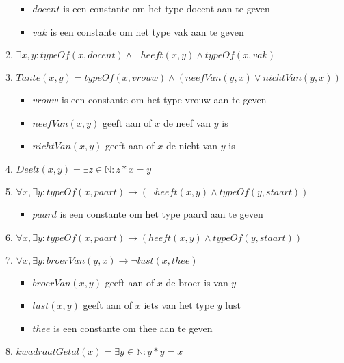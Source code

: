\documentclass[]{article}
\begin{document}
\begin{enumerate}[a]
\begin{enumerate}[i]
\begin{itemize}
        \item $docent$ is een constante om het type docent aan te geven
        \item $vak$ is een constante om het type vak aan te geven
      \end{itemize}
      \item $ \exists x,y : typeOf(x,docent) \land \neg heeft(x,y) \land typeOf(x,vak) $
      \item $ Tante(x,y) = typeOf(x,vrouw) \land (neefVan(y,x) \lor nichtVan(y,x)) $
      \begin{itemize}
        \item $vrouw$ is een constante om het type vrouw aan te geven
        \item $neefVan(x,y)$ geeft aan of $x$ de neef van $y$ is
        \item $nichtVan(x,y)$ geeft aan of $x$ de nicht van $y$ is
      \end{itemize}
      \item $Deelt(x,y) = \exists z \in \mathbb{N}: z * x = y$
      \item $ \forall x, \exists y: typeOf(x,paart) \longrightarrow (\neg heeft(x,y) \land typeOf(y,staart)) $
      \begin{itemize}
        \item $paard$ is een constante om het type paard aan te geven
      \end{itemize}
      \item $ \forall x, \exists y: typeOf(x,paart) \longrightarrow (heeft(x,y) \land typeOf(y,staart)) $
      \item $ \forall x, \exists y: broerVan(y,x) \longrightarrow \neg lust(x,thee) $
      \begin{itemize}
        \item $broerVan(x,y)$ geeft aan of $x$ de broer is van $y$
        \item $lust(x,y)$ geeft aan of $x$ iets van het type $y$ lust
        \item $thee$ is een constante om thee aan te geven
      \end{itemize}
      \item $kwadraatGetal(x) = \exists y \in \mathbb{N}: y*y = x $
    \end{enumerate}


\end{enumerate}
\end{document}
